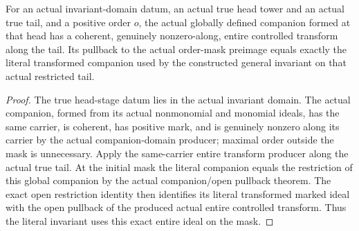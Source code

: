 \begin{theorem}
\label{hir:coherent-transform-literal-companion-extension}
\leanok
For an actual invariant-domain datum, an actual true head tower and an
actual true tail, and a positive order $o$, the actual globally defined
companion formed at that head has a coherent, genuinely nonzero-along,
entire controlled transform along the tail. Its pullback to the actual
order-mask preimage equals exactly the literal transformed companion used
by the constructed general invariant on that actual restricted tail.
\end{theorem}
\begin{proof}
The true head-stage datum lies in the actual invariant domain. The actual
companion, formed from its actual nonmonomial and monomial ideals, has the
same carrier, is coherent, has positive mark, and is genuinely nonzero
along its carrier by the actual companion-domain producer; maximal order
outside the mask is unnecessary. Apply the same-carrier entire transform
producer along the actual true tail. At the initial mask the literal
companion equals the restriction of this global companion by the actual
companion/open pullback theorem. The exact open restriction identity then
identifies its literal transformed marked ideal with the open pullback of
the produced actual entire controlled transform. Thus the literal invariant
uses this exact entire ideal on the mask.
\end{proof}

